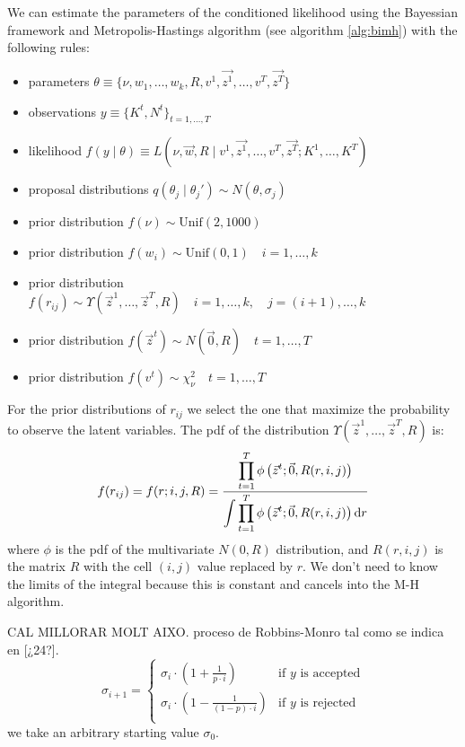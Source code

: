 \documentclass[11pt,fleqn]{book} %
\begin{document}
\begin{proposition}
	We can estimate the parameters of the conditioned likelihood using
	the Bayessian framework and Metropolis-Hastings algorithm 
	(see algorithm \ref{alg:bimh}) with the following rules:
	\begin{itemize}
		\item parameters $\theta \equiv \{ \nu,w_1,\dots,w_k,R,v^1,\vec{z^1},\dots,v^T,\vec{z^T}\}$
		\item observations $y \equiv \{K^t, N^t\}_{t=1,\dots,T}$
		\item likelihood $f(y \mid \theta) \equiv L(\nu,\vec{w},R  \mid  v^1,\vec{z^1},\dots,v^T,\vec{z^T} ; K^1,\dots,K^T)$
		\item proposal distributions $q(\theta_j \mid \theta_j') \sim N(\theta,\sigma_j)$
		\item prior distribution $f(\nu) \sim \text{Unif}(2,1000)$
		\item prior distribution $f(w_i) \sim \text{Unif}(0,1) \quad i=1,\dots,k$
		\item prior distribution $f(r_{ij}) \sim \Upsilon(\vec{z}^1,\dots,\vec{z}^T,R) \quad i=1,\dots,k, \quad j=(i+1),\dots,k$
		\item prior distribution $f(\vec{z}^t) \sim N(\vec{0},R) \quad t=1,\dots,T$
		\item prior distribution $f(v^t) \sim \chi_{\nu}^2 \quad t=1,\dots,T$
	\end{itemize}
	For the prior distributions of $r_{ij}$ we select the one that 
	maximize the probability to observe the latent variables. The 
	pdf of the distribution $\Upsilon(\vec{z}^1,\dots,\vec{z}^T,R)$ is:
	\begin{displaymath}
		f(r_{ij}) = f(r; i,j,R) = \frac
		{\displaystyle \prod_{t=1}^{T} \phi\left( \vec{z}^t; \vec{0}, R(r,i,j) \right)}
		{\displaystyle \int \prod_{t=1}^{T} \phi\left( \vec{z}^t; \vec{0}, R(r,i,j) \right) \mathop{\mathrm{{}d}}\mathopen{} r}
	\end{displaymath}
	where $\phi$ is the pdf of the multivariate $N(0,R)$ distribution,
	and $R(r,i,j)$ is the matrix $R$ with the cell $(i,j)$ value 
	replaced by $r$. We don't need to know the limits of the integral
	because this is constant and cancels into the M-H algorithm.
\end{proposition}

\begin{proposition}
CAL MILLORAR MOLT AIXO. 
proceso de Robbins-Monro tal como se indica en [¿24?].
	\begin{displaymath}
		\sigma_{i+1} = \left\{
		\begin{array}{ll}
			\sigma_i \cdot \left( 1 + \frac{1}{p \cdot i} \right) & \text{if $y$ is accepted} \\
			\sigma_i \cdot \left( 1 - \frac{1}{(1-p) \cdot i} \right) & \text{if $y$ is rejected} \\
		\end{array}
		\right.
	\end{displaymath}
	we take an arbitrary starting value $\sigma_0$.
\end{proposition}
\end{document}

